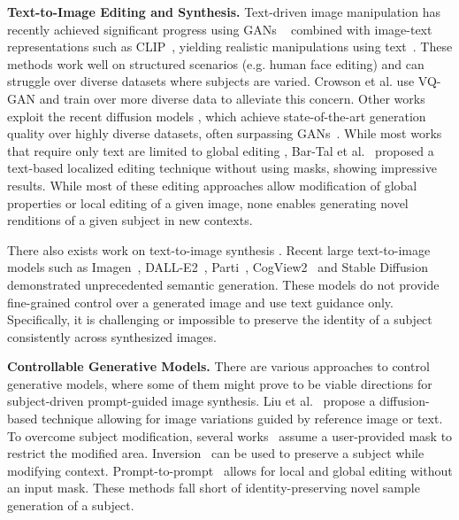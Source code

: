 \textbf{Text-to-Image Editing and Synthesis. } Text-driven image manipulation has recently achieved significant progress using GANs ~\cite{goodfellow2014generative,brock2018large,karras2021alias,karras2019style,karras2020analyzing} combined with image-text representations such as CLIP~\cite{radford2021learning}, yielding realistic manipulations using text~\cite{patashnik2021styleclip,gal2021stylegan, xia2021tedigan, abdal2021clip2stylegan,bau2021paint,mokady2022self}. These methods work well on structured scenarios (e.g. human face editing) and can struggle over diverse datasets where subjects are varied. Crowson et al. \cite{crowson2022vqgan} use VQ-GAN \cite{esser2021taming} and train over more diverse data to alleviate this concern. Other works~\cite{avrahami2022blended, kim2022diffusionclip} exploit the recent diffusion models \cite{ho2020denoising,sohl2015deep,song2019generative,ho2020denoising,song2020denoising,rombach2021highresolution,nichol2021improved,song2020improved,palette,saharia2021image}, which achieve state-of-the-art generation quality over highly diverse datasets, often surpassing GANs~\cite{dhariwal2021diffusion}. While most works that require only text are limited to global editing \cite{crowson2022vqgan, kwon2021clipstyler}, Bar-Tal et al.~\cite{bar2022text2live} proposed a text-based localized editing technique without using masks, showing impressive results. While most of these editing approaches allow modification of global properties or local editing of a given image, none enables generating novel renditions of a given subject in new contexts.

There also exists work on text-to-image synthesis \cite{ding2021cogview,hinz2020semantic,tao2020df, li2019controllable,li2019object,qiao2019learn,qiao2019mirrorgan,ramesh2021zero,zhang2018photographic,crowson2022vqgan, gafni2022make, rombach2021highresolution,jain2021dreamfields}. Recent large text-to-image models such as Imagen~\cite{saharia2022photorealistic}, DALL-E2~\cite{ramesh2022hierarchical}, Parti~\cite{yu2022scaling}, CogView2~\cite{ding2022cogview2} and Stable Diffusion~\cite{rombach2021highresolution} demonstrated unprecedented semantic generation. These models do not provide fine-grained control over a generated image and use text guidance only. Specifically, it is challenging or impossible to preserve the identity of a subject consistently across synthesized images.

\textbf{Controllable Generative Models. } There are various approaches to control generative models, where some of them might prove to be viable directions for subject-driven prompt-guided image synthesis. Liu et al.~\cite{liu2019more} propose a diffusion-based technique allowing for image variations guided by reference image or text. To overcome subject modification, several works~\cite{nichol2021glide, avrahami2022blendedlatent} assume a user-provided mask to restrict the modified area. Inversion~\cite{choi2021ilvr,dhariwal2021diffusion,ramesh2022hierarchical} can be used to preserve a subject while modifying context. Prompt-to-prompt~\cite{hertz2022prompt} allows for local and global editing without an input mask. These methods fall short of identity-preserving novel sample generation of a subject.


